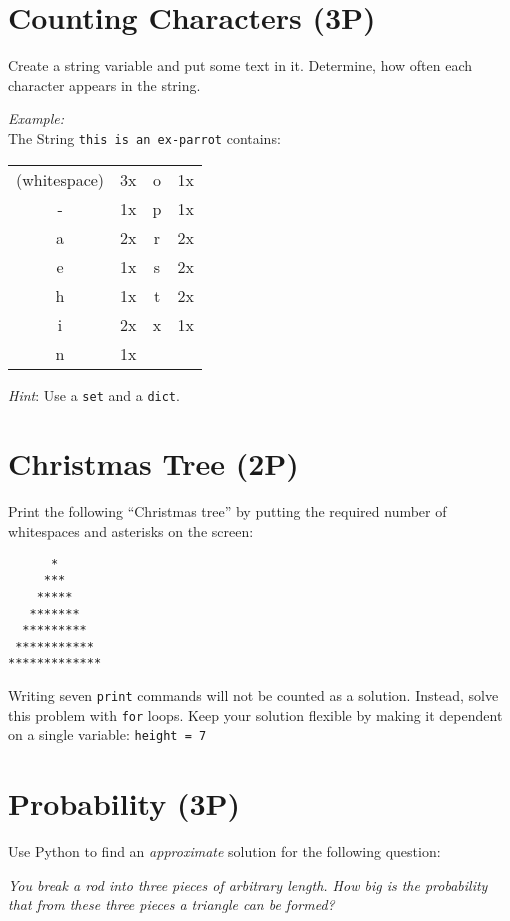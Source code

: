 \documentclass[
	ngerman,
	fontsize=10pt,
	parskip=half,
	titlepage=true,
	DIV=12
]{scrartcl}
\newcommand*{\inPy}[1]{\texttt{#1}}
\begin{document}
\section{Counting Characters (3\;P)}
Create a string variable and put some text in it. Determine, how often each character appears in the string.

\emph{Example:}\\
The String \texttt{this is an ex-parrot} contains:
\begin{center}
\begin{tabular}{cc|cc}
(whitespace) & 3x & o            & 1x \\
-            & 1x & p            & 1x \\
a            & 2x & r            & 2x \\
e            & 1x & s            & 2x \\
h            & 1x & t            & 2x \\
i            & 2x & x            & 1x \\
n            & 1x 
\end{tabular}
\end{center}

\emph{Hint}: Use a \inPy{set} and a \inPy{dict}.


\section{Christmas Tree (2\;P)}
Print the following \enquote{Christmas tree} by putting the required number of whitespaces and asterisks on the screen:
\begin{verbatim}
      *
     ***
    *****
   *******
  *********
 ***********
*************
\end{verbatim}

Writing seven \inPy{print} commands will not be counted as a solution. Instead, solve this problem with \inPy{for} loops. Keep your solution flexible by making it dependent on a single variable:
\texttt{height = 7}


\section{Probability (3\;P)}
Use Python to find an \emph{approximate} solution for the following question:
\begin{center}
	\emph{You break a rod into three pieces of arbitrary length. How big is the probability that from these three pieces a triangle can be formed?}
\end{center}
\end{document}

